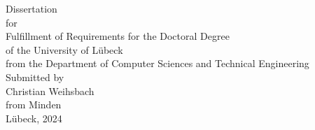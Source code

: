 \begin{center}
\begin{Large}
\end{Large}
\vspace*{2.5cm}
%
%
Dissertation\\
for\\
Fulfillment of Requirements for the Doctoral Degree\\
of the University of Lübeck\\[1.0cm]
%
from the Department of Computer Sciences and Technical Engineering\\[1.0cm]
%
Submitted by\\[0.1cm]
Christian Weihsbach\\[0.1cm]
from Minden\\[3.0cm]
%
Lübeck, 2024
\end{center}




\newpage
\thispagestyle{empty}

\addtolength{\topmargin}{1.2cm}
\addtolength{\textwidth}{-2.35cm}
